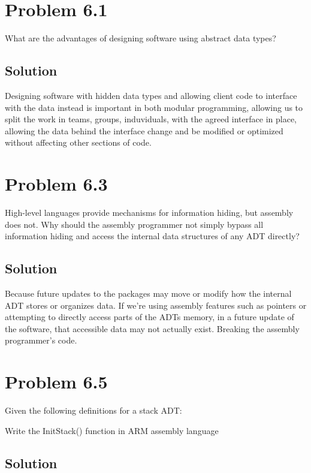 \documentclass[letterpaper,11pt]{texMemo} %
\begin{document}
\maketitle %

\section*{Problem 6.1}
What are the advantages of designing software using abstract data types?
\subsection*{Solution}
Designing software with hidden data types and allowing client code to interface with the data
instead is important in both modular programming, allowing us to split the work in teams, 
groups, induviduals, with the agreed interface in place, allowing the data behind the interface 
change and be modified or optimized without affecting other sections of code.

\section*{Problem 6.3}
High-level languages provide mechanisms for information hiding, but assembly does not.
Why should the assembly programmer not simply bypass all information hiding and access the
internal data structures of any ADT directly?
\subsection*{Solution}
Because future updates to the packages may move or modify how the internal ADT stores or organizes data.
If we're using assembly features such as pointers or attempting to directly access parts of the
ADTs memory, in a future update of the software, that accessible data may not actually exist. 
Breaking the assembly programmer's code.

\section*{Problem 6.5}
Given the following definitions for a stack ADT:


Write the InitStack() function in ARM assembly language
\subsection*{Solution}

\end{document}
